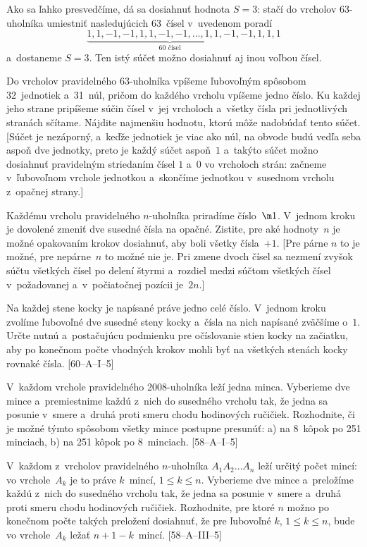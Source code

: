 {Ako sa ľahko presvedčíme,  dá sa dosiahnuť hodnota $S = 3$:
stačí do vrcholov 63-uholníka umiestniť nasledujúcich 63~čísel v~uvedenom poradí
$$
\underbrace{1,1,-1,-1,1,1,-1,-1,\dots,1,1,-1,-1}_{\text{60 čísel}},1,1,1
$$
a~dostaneme $S = 3$. Ten istý súčet možno dosiahnuť aj inou
voľbou čísel.


Do vrcholov pravidelného 63-uholníka vpíšeme ľubovoľným spôsobom
32~jednotiek a~31~núl, pričom do každého vrcholu vpíšeme jedno
číslo. Ku každej jeho strane pripíšeme súčin čísel v~jej vrcholoch
a~všetky čísla pri jednotlivých stranách sčítame. Nájdite najmenšiu
hodnotu, ktorú môže nadobúdať tento súčet. [Súčet je nezáporný,
a~keďže jednotiek je viac ako núl, na obvode budú vedľa seba aspoň dve
jednotky, preto je každý súčet aspoň~$1$ a~takýto súčet možno dosiahnuť
pravidelným striedaním čísel $1$ a~$0$ vo vrcholoch strán: začneme v~ľubovoľnom
vrchole jednotkou a~skončíme jednotkou v~susednom vrcholu z~opačnej strany.]

Každému vrcholu pravidelného $n$-uholníka priradíme číslo~$\m1$.
V~jednom kroku je dovolené zmeniť dve susedné čísla na opačné. Zistite,
pre aké hodnoty~$n$ je možné opakovaním krokov dosiahnuť, aby boli
všetky čísla~$+1$. [Pre párne $n$ to je možné, pre nepárne~$n$ to možné
nie je. Pri zmene dvoch čísel sa nezmení zvyšok súčtu všetkých
čísel po delení štyrmi a~rozdiel medzi súčtom všetkých čísel
v~požadovanej a~v~počiatočnej pozícii je~$2n$.]

\D
Na každej stene kocky je napísané práve jedno celé číslo. V~jednom kroku
zvolíme ľubovoľné dve susedné steny kocky a~čísla na nich napísané
zväčšíme o~$1$. Určte nutnú a~postačujúcu podmienku pre očíslovanie stien kocky
na začiatku, aby po konečnom počte vhodných krokov mohli byť na
všetkých stenách kocky rovnaké čísla.
[60--A--I--5]

V~každom vrchole pravidelného 2008-uholníka leží jedna minca.
Vyberieme dve mince a~premiestnime každú z~nich do susedného vrcholu
tak, že jedna sa posunie v~smere
a~druhá proti smeru chodu hodinových ručičiek.
Rozhodnite, či je možné týmto spôsobom všetky mince postupne
presunúť:
 a) na 8~kôpok po 251 minciach,
 b) na 251 kôpok po 8~minciach.   [58--A--I--5]

V~každom z~vrcholov pravidelného $n$-uholníka $A_1A_2\dots A_n$ leží určitý počet mincí: vo vrchole~$A_k$ je to práve $k$~mincí, $1\le k\le n$. Vyberieme dve mince a~preložíme každú z~nich do susedného vrcholu tak, že jedna sa posunie v~smere a~druhá proti smeru chodu hodinových ručičiek. Rozhodnite, pre ktoré $n$ možno po konečnom počte takých preložení dosiahnuť, že pre ľubovoľné $k$, $1\le k\le n$, bude vo vrchole~$A_k$ ležať $n+1-k$~mincí.
   [58--A--III--5]
}

